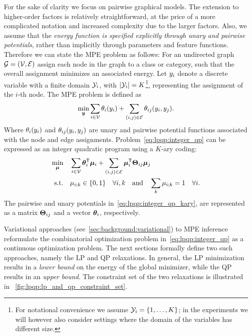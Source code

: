For the sake of clarity we focus on pairwise graphical models. The extension
to higher-order factors is relatively straightforward, at the price of a more
complicated notation and increased complexity due to the larger factors. Also,
we assume that the \emph{energy function is specified explicitly through unary and
pairwise potentials}, rather than implicitly through parameters and feature
functions. Therefore we can state the \ac{MPE} problem as follows:
For an undirected graph $\mathcal{G}=(\mathcal{V},\mathcal{E})$
assign each node in the graph to a class or category, such that the overall assignment
minimizes an associated energy. 
Let $y_i$ denote a discrete variable with a finite domain
$\mathcal{Y}_i$, with $|\mathcal{Y}_i|=K$\footnote{For notational convenience we assume
$\mathcal{Y}_i = \{1,\ldots,K\}$; in the experiments we will however also
consider settings where the domain of the variables has different
size.}, representing the assignment of the $i$-th node. 
The \ac{MPE} problem is defined as
\begin{equation}
    \min_{\bm{y}} \sum_{i\in\mathcal{V}} \theta_i(y_i) + \sum_{(i,j) \in
    \mathcal{E}} \theta_{ij}(y_i, y_j).
    \label{eq:lpqp:integer_qp}
\end{equation}
Where $\theta_i(y_i)$ and
$\theta_{ij}(y_i,y_j)$ are unary
and pairwise potential functions associated with the node and edge
assignments.
Problem~\eqref{eq:lpqp:integer_qp} can be expressed
as an integer quadratic program using a $K$-ary coding:
\begin{align}
    \min_{\bm{\mu}} \quad &  \sum_{i\in\mathcal{V}}
    \bm{\theta}_{i}^{\mathsf{T}}\bm{\mu}_{i} +
    \sum_{(i,j) \in
    \mathcal{E}} \bm{\mu}_{i}^{\mathsf{T}}\bm{\Theta}_{ij}
    \bm{\mu}_{j}
    \label{eq:lpqp:integer_qp_kary}
    \\
    \text{s.t.} \quad & \mu_{i;k} \in \{0,1\} \quad \forall i,k
    \quad\text{and}\quad \sum_{k}\mu_{i;k} = 1 \quad \forall i. \notag
\end{align}
The pairwise and unary potentials in~\eqref{eq:lpqp:integer_qp_kary}, are represented as a matrix
$\bm{\Theta}_{ij}$ and a vector $\bm{\theta}_{i}$, respectively. 

Variational approaches (see~\autoref{sec:background:variational}) to \ac{MPE} inference reformulate the combinatorial
optimization problem in~\eqref{eq:lpqp:integer_qp} as a continuous optimization
problem. The next sections formally define two such approaches, namely 
the \ac{LP} and \ac{QP} relaxations. In general, the \ac{LP} minimization
results in a \emph{lower bound} on the
energy of the global minimizer, while the \ac{QP} results in an \emph{upper
bound}. The constraint set of the two relaxations is illustrated in
~\autoref{fig:lpqp:lp_and_qp_constraint_set}.

